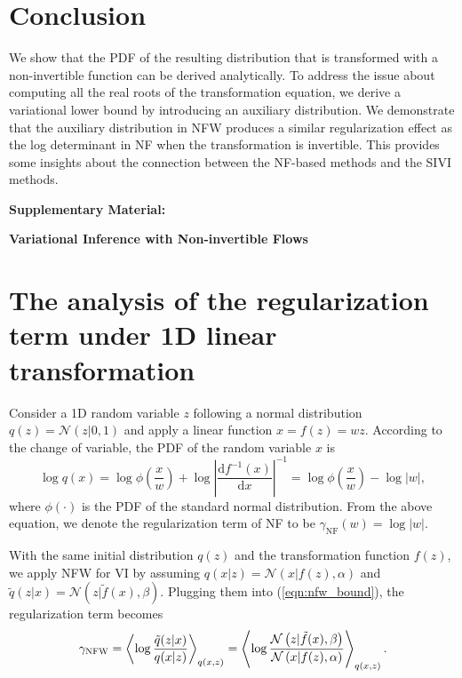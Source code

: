\documentclass[twoside]{article}
\newcommand{\expectationDist}[2]{\left\langle #1 \right\rangle _{#2}}
\newcommand{\diff}{\text{d}}
\newcommand{\gaussianDist}[3]{\mathcal{N}\left(#1|#2,#3\right)}
\newcommand{\acr}[1]{\textsc{#1}\xspace}
\newcommand{\us}{\acr{NFW}}
\begin{document}
\section{Conclusion}

We show that the PDF of the resulting distribution that is transformed with a non-invertible function can be derived analytically. To address the issue about computing all the real roots of the transformation equation, we derive a variational lower bound by introducing an auxiliary distribution. We demonstrate that the auxiliary distribution in \us produces a similar regularization effect as the log determinant in NF when the transformation is invertible. This provides some insights about the connection between the NF-based methods and the SIVI methods.

{


}

\newpage
\setcounter{page}{1}

\appendix
\onecolumn

    \begin{center}{\textbf{\LARGE Supplementary Material:}}
    \end{center}

    \begin{center}{\textbf{\Large Variational Inference with Non-invertible Flows}}
    \end{center}
    \vspace{0.3in}



\section{The analysis of the regularization term under 1D linear transformation}

Consider a 1D random variable $z$ following a normal distribution $q(z) = \gaussianDist{z}{0}{1}$ and apply a linear function $x=f(z)=wz$. According to the change of variable, the PDF of the random variable $x$ is
\begin{equation}
\log q(x) = \log \phi(\frac{x}{w})+ \log \left| \frac{\diff f^{-1}(x)}{\diff x} \right|^{-1} = \log \phi(\frac{x}{w}) - \log|w|,
\end{equation}
where $\phi(\cdot)$ is the PDF of the standard normal distribution. From the above equation, we denote the regularization term of NF to be $\gamma_{\text{NF}}(w) = \log|w|$.

With the same initial distribution $q(z)$ and the transformation function $f(z)$, we apply \us for VI by assuming $q(x|z) = \gaussianDist{x}{f(z)}{\alpha}$ and $\tilde{q}(z|x) = \gaussianDist{z}{\tilde{f}(x)}{\beta}$. Plugging them into (\ref{eqn:nfw_bound}), the regularization term becomes
\begin{equation}
\gamma_{\text{\us}} = \expectationDist{\log \frac{\tilde{q}(z | x)}{q(x|z)}}{q(x,z)} = \expectationDist{\log \frac{\gaussianDist{z}{\tilde{f}(x)}{\beta}}{\gaussianDist{x}{f(z)}{\alpha}}}{q(x,z)}.
\end{equation}
\end{document}
